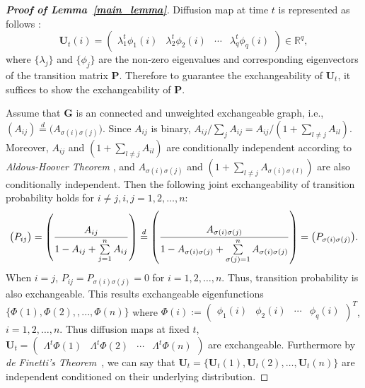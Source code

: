 \documentclass[11pt]{article}
\theoremstyle{definition}
\begin{document}
\begin{proof}[\textbf{Proof of Lemma~\ref{main_lemma}}]
	Diffusion map at time $t$ is represented as follows :
	\begin{equation}
	\mathbf{U}_{t}(i) = \begin{pmatrix} \lambda^{t}_{1} \phi_{1}(i) & \lambda^{t}_{2} \phi_{2} (i)  & \cdots & \lambda^{t}_{q} \phi_{q}(i) \end{pmatrix} \in \mathbb{R}^{q},
	\end{equation}
where $\{ \lambda_{j} \}$ and $\{ \phi_{j}  \}$ are the non-zero eigenvalues and corresponding eigenvectors of the transition matrix $\mathbf{P}$. Therefore to guarantee the exchangeability of $\mathbf{U}_{t}$, it suffices to show the exchangeability of $\mathbf{P}$.
	
Assume that $\mathbf{G}$ is an connected and unweighted exchangeable graph, i.e., $(A_{ij}) \stackrel{d}{=} \big( A_{\sigma(i) \sigma(j)} \big)$. Since $A_{ij}$ is binary, $A_{ij} / \sum\limits_{j} A_{ij} = A_{ij} /  (1 + \sum\limits_{l \neq j} A_{il})$. Moreover, $A_{ij}$ and $(1 + \sum\limits_{l \neq j} A_{il})$ are conditionally independent according to \textit{Aldous-Hoover Theorem} \cite{aldous1981representations}, and $A_{\sigma(i) \sigma(j)}$ and $(1 + \sum\limits_{l \neq j} A_{\sigma(i) \sigma(l)})$ are also conditionally independent. Then the following joint exchangeability of transition probability holds for $i \neq j, i,j = 1,2, \ldots,n$:	
	\begin{equation}
		\vspace*{-0.2cm}
	\big( P_{ij} \big) = \left(  \frac{A_{ij}}{1 - A_{ij} + \sum\limits_{j=1}^{n} A_{ij} } \right)  \stackrel{d}{=} \left( \frac{A_{\sigma(i) \sigma(j)} }{1 - A_{\sigma(i) \sigma(j)} + \sum\limits_{\sigma(j) = 1}^{n} A_{\sigma(i) \sigma(j)} } \right) = \big( P_{\sigma(i) \sigma(j)} \big).
	\end{equation}
When $i = j$, $P_{ij} = P_{\sigma(i) \sigma(j)} = 0$ for $i=1,2, \ldots, n$. Thus, transition probability is also exchangeable. This results exchangeable eigenfunctions $\{ \Phi(1), \Phi(2), , ... , \Phi(n) \}$ where $\Phi(i) := \begin{pmatrix} \phi_{1}(i) & \phi_{2}(i) & \cdots & \phi_{q}(i) \end{pmatrix}^{T}$, $i=1,2, \ldots, n$. Thus diffusion maps at fixed $t$, $\mathbf{U}_{t} = \begin{pmatrix} \Lambda^{t} \Phi(1)  & \Lambda^{t} \Phi(2) & \cdots & \Lambda^{t} \Phi(n)  \end{pmatrix}$ are exchangeable. Furthermore by \textit{de Finetti's Theorem}~\cite{diaconis1980finite}, we can say that $\mathbf{U}_{t} = \{ \mathbf{U}_{t}(1), \mathbf{U}_{t}(2), \ldots, \mathbf{U}_{t}(n)  \}$ are independent conditioned on their underlying distribution.
\end{proof}
\end{document}
